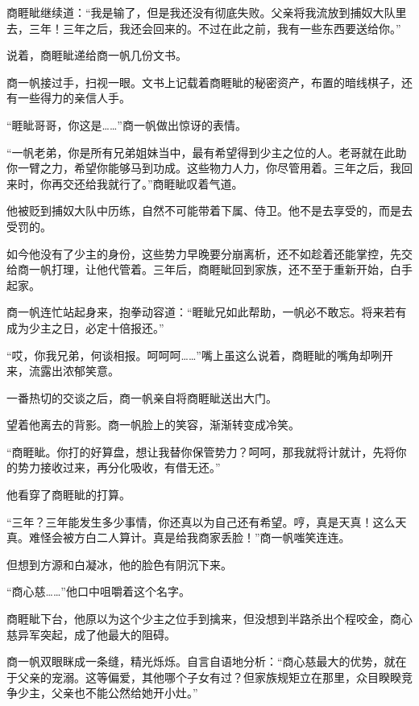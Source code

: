 
\begin{this_body}

商睚眦继续道：“我是输了，但是我还没有彻底失败。父亲将我流放到捕奴大队里去，三年！三年之后，我还会回来的。不过在此之前，我有一些东西要送给你。”

说着，商睚眦递给商一帆几份文书。

商一帆接过手，扫视一眼。文书上记载着商睚眦的秘密资产，布置的暗线棋子，还有一些得力的亲信人手。

“睚眦哥哥，你这是……”商一帆做出惊讶的表情。

“一帆老弟，你是所有兄弟姐妹当中，最有希望得到少主之位的人。老哥就在此助你一臂之力，希望你能够马到功成。这些物力人力，你尽管用着。三年之后，我回来时，你再交还给我就行了。”商睚眦叹着气道。

他被贬到捕奴大队中历练，自然不可能带着下属、侍卫。他不是去享受的，而是去受罚的。

如今他没有了少主的身份，这些势力早晚要分崩离析，还不如趁着还能掌控，先交给商一帆打理，让他代管着。三年后，商睚眦回到家族，还不至于重新开始，白手起家。

商一帆连忙站起身来，抱拳动容道：“睚眦兄如此帮助，一帆必不敢忘。将来若有成为少主之日，必定十倍报还。”

“哎，你我兄弟，何谈相报。呵呵呵……”嘴上虽这么说着，商睚眦的嘴角却咧开来，流露出浓郁笑意。

一番热切的交谈之后，商一帆亲自将商睚眦送出大门。

望着他离去的背影。商一帆脸上的笑容，渐渐转变成冷笑。

“商睚眦。你打的好算盘，想让我替你保管势力？呵呵，那我就将计就计，先将你的势力接收过来，再分化吸收，有借无还。”

他看穿了商睚眦的打算。

“三年？三年能发生多少事情，你还真以为自己还有希望。哼，真是天真！这么天真。难怪会被方白二人算计。真是给我商家丢脸！”商一帆嗤笑连连。

但想到方源和白凝冰，他的脸色有阴沉下来。

“商心慈……”他口中咀嚼着这个名字。

商睚眦下台，他原以为这个少主之位手到擒来，但没想到半路杀出个程咬金，商心慈异军突起，成了他最大的阻碍。

商一帆双眼眯成一条缝，精光烁烁。自言自语地分析：“商心慈最大的优势，就在于父亲的宠溺。这等偏爱，其他哪个子女有过？但家族规矩立在那里，众目睽睽竞争少主，父亲也不能公然给她开小灶。”


\end{this_body}
